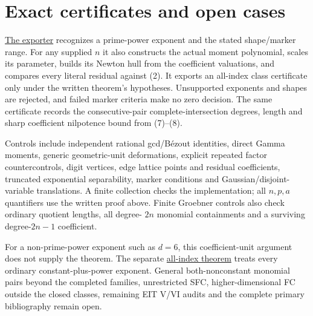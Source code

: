 \documentclass[11pt]{article}
\begin{document}
\section{Exact certificates and open cases}
\href{prime_power_windows.py}{The exporter} recognizes a prime-power
exponent and the stated shape/marker range. For any supplied $n$ it also
constructs the actual moment polynomial, scales its parameter, builds
its Newton hull from the coefficient valuations, and compares every
literal residual against (2). It exports an all-index class certificate
only under the written theorem's hypotheses. Unsupported exponents and
shapes are rejected, and failed marker criteria make no zero decision.
The same certificate records the consecutive-pair complete-intersection
degrees, length and sharp coefficient nilpotence bound from (7)--(8).

Controls include independent rational gcd/B\'ezout identities, direct
Gamma moments, generic geometric-unit deformations, explicit repeated
factor countercontrols, digit vertices, edge lattice points and residual
coefficients, truncated exponential separability, marker conditions and
Gaussian/disjoint-variable translations. A finite collection checks the
implementation; all $n,p,a$ quantifiers use the written proof above.
Finite Groebner controls also check ordinary quotient lengths, all degree-
$2n$ monomial containments and a surviving degree-$2n-1$ coefficient.

For a non-prime-power exponent such as $d=6$, this coefficient-unit
argument does not supply the theorem. The separate
\href{ALL_UNIVARIATE_TWO_TERM_SFC.tex}{all-index theorem} treats every
ordinary constant-plus-power exponent. General both-nonconstant monomial
pairs beyond the completed families, unrestricted SFC, higher-dimensional
FC outside the closed classes, remaining EIT V/VI audits and the complete
primary bibliography remain open.
\end{document}
